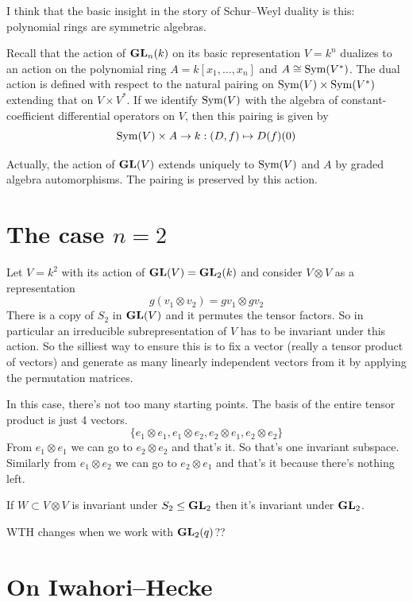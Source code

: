 \documentclass[11pt]{article}
\begin{document}
I think that the basic insight in the story of Schur--Weyl duality is this: polynomial rings are symmetric algebras. 

Recall that the action of ${\mathbf{GL}}_n(k)$ on its basic representation $V = k^n$
dualizes to an action on the polynomial ring $A = k[x_1,\dots,x_n]$
and $A\cong\operatorname{Sym}(V^\ast)$. The dual action is defined with respect to the natural pairing on $\operatorname{Sym}(V)\times\operatorname{Sym}(V^\ast)$ extending that on $V\times V^\ast$. If we identify $\operatorname{Sym}(V)$ with the algebra of constant-coefficient differential operators on $V$, then this pairing is given by 
\begin{equation}
    \operatorname{Sym}(V)\times A \to k : (D,f) \mapsto D(f)(0)
\end{equation}

\begin{exer}
    Actually, the action of ${\mathbf{GL}}(V)$ extends uniquely to $\operatorname{Sym}(V)$ and $A$ by graded algebra automorphisms. The pairing is preserved by this action. 
\end{exer}

\section*{The case $n=2$}

Let $V = k^2$ with its action of ${\mathbf{GL}}(V) = {\mathbf{GL}}_2(k)$ and consider $V\otimes V$ as a representation 
\begin{equation}
    g(v_1\otimes v_2) = gv_1\otimes gv_2 
\end{equation}
There is a copy of $S_2$ in ${\mathbf{GL}}(V)$ and it permutes the tensor factors. So in particular an irreducible subrepresentation of $V$ has to be invariant under this action. So the silliest way to ensure this is to fix a vector (really a tensor product of vectors) and generate as many linearly independent vectors from it by applying the permutation matrices. 

In this case, there's not too many starting points. The basis of the entire tensor product is just 4 vectors. 
\[
\{e_1 \otimes e_1, e_1\otimes e_2, e_2\otimes e_1, e_2\otimes e_2 \}    
\]
From $e_1\otimes e_1$ we can go to $e_2\otimes e_2$ and that's it. So that's one invariant subspace. Similarly from $e_1\otimes e_2$ we can go to $e_2\otimes e_1$ and that's it because there's nothing left. 

\begin{exer}
    If $W\subset V\otimes V$ is invariant under $S_2\le {\mathbf{GL}}_2$ then it's invariant under ${\mathbf{GL}}_2$. 
\end{exer}

\begin{exer}
    WTH changes when we work with ${\mathbf{GL}}_2(q)$?? 
\end{exer}

\section*{On Iwahori--Hecke}
\end{document}
